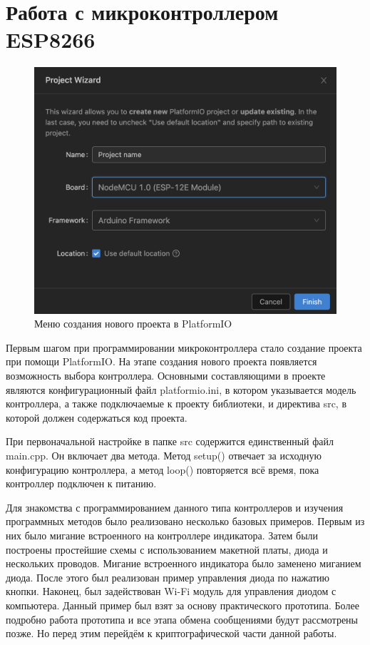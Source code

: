 	
	\section{Работа с микроконтроллером ESP8266}
	
	\begin{figure}[h]
		\centering
		\includegraphics[scale=0.6]{resources/platformio-new-project}
		\caption{Меню создания нового проекта в PlatformIO}
		\label{fig4.1}
	\end{figure}
	
	Первым шагом при программировании микроконтроллера стало создание проекта при помощи PlatformIO.
	На этапе создания нового проекта появляется возможность выбора контроллера. Основными составляющими
	в проекте являются конфигурационный файл platformio.ini, в котором указывается модель контроллера,
	а также подключаемые к проекту библиотеки, и директива src, в которой должен содержаться код проекта.
	
	При первоначальной настройке в папке src содержится единственный файл main.cpp. Он включает два
	метода. Метод setup() отвечает за исходную конфигурацию контроллера, а метод loop()
	повторяется всё время, пока контроллер подключен к питанию.
	
	Для знакомства с программированием данного типа контроллеров и изучения программных методов
	было реализовано несколько базовых примеров. Первым из них было мигание встроенного на контроллере
	индикатора. Затем были построены простейшие схемы с использованием макетной платы, диода и
	нескольких проводов. Мигание встроенного индикатора было заменено миганием диода. После этого
	был реализован пример управления диода по нажатию кнопки. Наконец, был задействован Wi-Fi модуль
	для управления диодом с компьютера. Данный пример был взят за основу практического прототипа. Более
	подробно работа прототипа и все этапа обмена сообщениями будут рассмотрены позже. Но перед этим
	перейдём к криптографической части данной работы.
	
